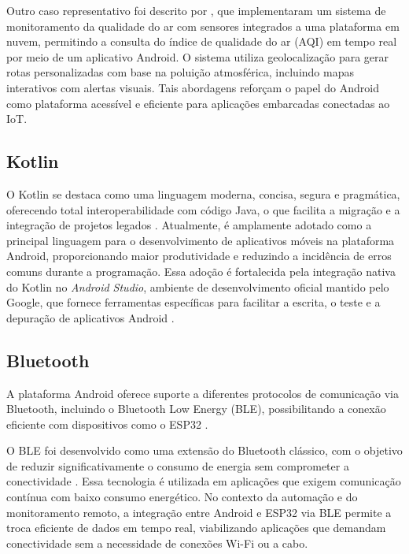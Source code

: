 Outro caso representativo foi descrito por , que implementaram um sistema de monitoramento da qualidade do ar com sensores integrados a uma plataforma em nuvem, permitindo a consulta do índice de qualidade do ar (AQI) em tempo real por meio de um aplicativo Android. O sistema utiliza geolocalização para gerar rotas personalizadas com base na poluição atmosférica, incluindo mapas interativos com alertas visuais. Tais abordagens reforçam o papel do Android como plataforma acessível e eficiente para aplicações embarcadas conectadas ao IoT.

\subsection{Kotlin}

O Kotlin se destaca como uma linguagem moderna, concisa, segura e pragmática, oferecendo total interoperabilidade com código Java, o que facilita a migração e a integração de projetos legados \cite{JEMEROV2017}. Atualmente, é amplamente adotado como a principal linguagem para o desenvolvimento de aplicativos móveis na plataforma Android, proporcionando maior produtividade e reduzindo a incidência de erros comuns durante a programação. Essa adoção é fortalecida pela integração nativa do Kotlin no \textit{Android Studio}, ambiente de desenvolvimento oficial mantido pelo Google, que fornece ferramentas específicas para facilitar a escrita, o teste e a depuração de aplicativos Android \cite{ANDROIDSTUDIO}.

\subsection{Bluetooth}

A plataforma Android oferece suporte a diferentes protocolos de comunicação via Bluetooth, incluindo o Bluetooth Low Energy (BLE), possibilitando a conexão eficiente com dispositivos como o ESP32 \cite{android_bluetooth_overview}.

O BLE foi desenvolvido como uma extensão do Bluetooth clássico, com o objetivo de reduzir significativamente o consumo de energia sem comprometer a conectividade \cite{heydon2012bluetooth}. Essa tecnologia é utilizada em aplicações que exigem comunicação contínua com baixo consumo energético. No contexto da automação e do monitoramento remoto, a integração entre Android e ESP32 via BLE permite a troca eficiente de dados em tempo real, viabilizando aplicações que demandam conectividade sem a necessidade de conexões Wi-Fi ou a cabo.

